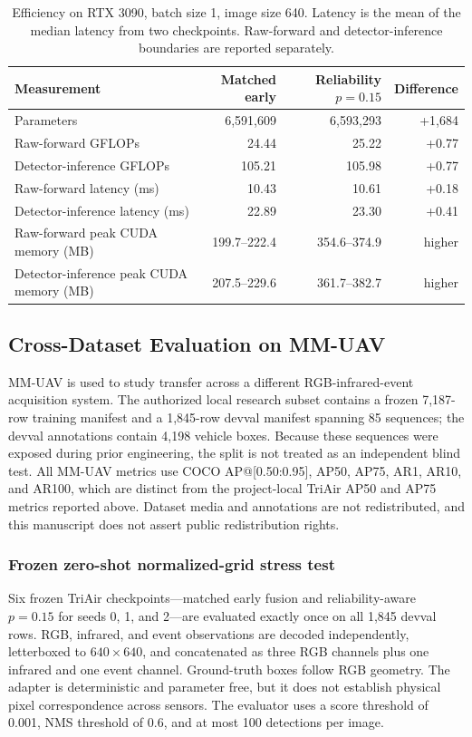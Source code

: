 \begin{table}[t]
\centering
\caption{Efficiency on RTX 3090, batch size 1, image size 640. Latency is the mean of the median latency from two checkpoints. Raw-forward and detector-inference boundaries are reported separately.}
\label{tab:efficiency}
\small
\begin{tabular}{@{}lrrr@{}}
\toprule
Measurement & Matched early & Reliability $p=0.15$ & Difference\\
\midrule
Parameters & 6,591,609 & 6,593,293 & +1,684\\
Raw-forward GFLOPs & 24.44 & 25.22 & +0.77\\
Detector-inference GFLOPs & 105.21 & 105.98 & +0.77\\
Raw-forward latency (ms) & 10.43 & 10.61 & +0.18\\
Detector-inference latency (ms) & 22.89 & 23.30 & +0.41\\
Raw-forward peak CUDA memory (MB) & 199.7--222.4 & 354.6--374.9 & higher\\
Detector-inference peak CUDA memory (MB) & 207.5--229.6 & 361.7--382.7 & higher\\
\bottomrule
\end{tabular}
\end{table}


\subsection{Cross-Dataset Evaluation on MM-UAV}
\label{sec:mmuav}
MM-UAV is used to study transfer across a different RGB-infrared-event acquisition system. The authorized local research subset contains a frozen 7,187-row training manifest and a 1,845-row devval manifest spanning 85 sequences; the devval annotations contain 4,198 vehicle boxes. Because these sequences were exposed during prior engineering, the split is not treated as an independent blind test. All MM-UAV metrics use COCO AP@[0.50:0.95], AP50, AP75, AR1, AR10, and AR100, which are distinct from the project-local TriAir AP50 and AP75 metrics reported above. Dataset media and annotations are not redistributed, and this manuscript does not assert public redistribution rights.

\subsubsection{Frozen zero-shot normalized-grid stress test}
Six frozen TriAir checkpoints---matched early fusion and reliability-aware $p=0.15$ for seeds 0, 1, and 2---are evaluated exactly once on all 1,845 devval rows. RGB, infrared, and event observations are decoded independently, letterboxed to $640\times640$, and concatenated as three RGB channels plus one infrared and one event channel. Ground-truth boxes follow RGB geometry. The adapter is deterministic and parameter free, but it does not establish physical pixel correspondence across sensors. The evaluator uses a score threshold of 0.001, NMS threshold of 0.6, and at most 100 detections per image.

